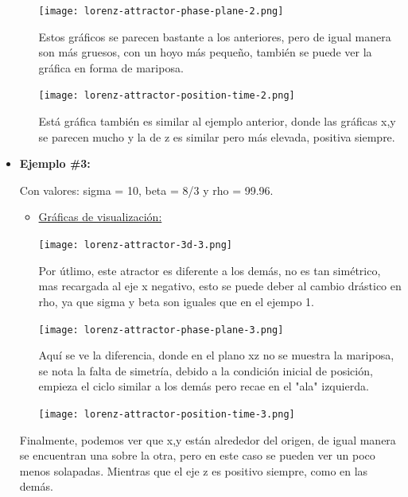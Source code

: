\documentclass[12pt]{article}
\begin{document}
\begin{itemize}
\begin{itemize}
\begin{center}
        \texttt{[image: lorenz-attractor-phase-plane-2.png]}
\end{center}

Estos gráficos se parecen bastante a los anteriores, pero de igual manera son más gruesos, con un hoyo más pequeño, también se puede ver la gráfica en forma de mariposa.

\begin{center}
        \texttt{[image: lorenz-attractor-position-time-2.png]}
\end{center}

Está gráfica también es similar al ejemplo anterior, donde las gráficas x,y se parecen mucho y la de z es similar pero más elevada, positiva siempre.

\end{itemize}

\clearpage

\item \textbf{Ejemplo \#3:} 

Con valores: sigma = 10, beta = 8/3 y rho = 99.96.

\begin{itemize}
\item \underline{Gráficas de visualización:} 
\begin{center}
        \texttt{[image: lorenz-attractor-3d-3.png]}
\end{center}

Por útlimo, este atractor es diferente a los demás, no es tan simétrico, mas recargada al eje x negativo, esto se puede deber al cambio drástico en rho, ya que sigma y beta son iguales que en el ejempo 1. 

\begin{center}
        \texttt{[image: lorenz-attractor-phase-plane-3.png]}
\end{center}

Aquí se ve la diferencia, donde en el plano xz no se muestra la mariposa, se nota la falta de simetría, debido a la condición inicial de posición, empieza el ciclo similar a los demás pero recae en el "ala" izquierda.

\begin{center}
        \texttt{[image: lorenz-attractor-position-time-3.png]}
\end{center}
\end{itemize}

Finalmente, podemos ver que x,y están alrededor del origen, de igual manera se encuentran una sobre la otra, pero en este caso se pueden ver un poco menos solapadas. Mientras que el eje z es positivo siempre, como en las demás. 

\end{itemize}
\end{document}
